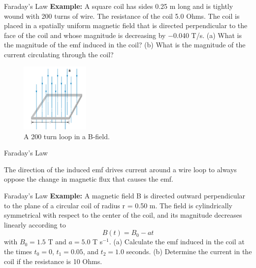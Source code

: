\documentclass{beamer}
\begin{document}
\begin{frame}{Faraday's Law}
\small
\textbf{Example:}
A square coil has sides 0.25 m long and is tightly wound with 200 turns of wire. The resistance of the coil 5.0 Ohms. The coil is placed in a spatially uniform magnetic field that is directed perpendicular to the face of the coil and whose magnitude is decreasing by −0.040 T/s. (a) What is the magnitude of the emf induced in the coil? (b) What is the magnitude of the current circulating through the coil?
\begin{figure}
\centering
\includegraphics[width=0.3\textwidth]{figures/loop1.png}
\caption{\label{fig:loop1} A 200 turn loop in a B-field.}
\end{figure}
\end{frame}

\begin{frame}{Faraday's Law}
\begin{tcolorbox}[colback=white,colframe=black!40!black,title=Lenz's Law]
\alert{The direction of the induced emf drives current around a wire loop to always oppose the change in magnetic flux that
causes the emf.}
\end{tcolorbox}
\end{frame}

\begin{frame}{Faraday's Law}
\small
\textbf{Example:}
A magnetic field B is directed outward perpendicular to the plane of a circular coil of radius r = 0.50 m.  The field is cylindrically symmetrical with respect to the center of the coil, and its magnitude decreases linearly according to
\begin{equation}
B(t) = B_0 - a t
\end{equation}
with $B_0 = 1.5$ T and $a = 5.0$ T s$^{-1}$.  (a) Calculate the emf induced in the coil at the times $t_0 = 0$, $t_1 = 0.05$, and $t_2 = 1.0$ seconds. (b) Determine the current in the coil if the resistance is 10 Ohms. 
\end{frame}
\end{document}
